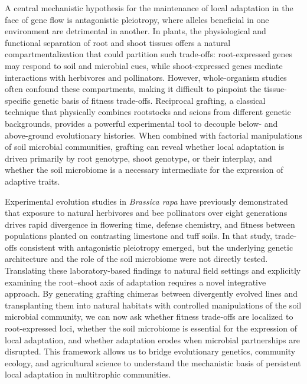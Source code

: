 \documentclass{article}
\begin{document}
A central mechanistic hypothesis for the maintenance of local adaptation in the face of gene flow is antagonistic pleiotropy, where alleles beneficial in one environment are detrimental in another. In plants, the physiological and functional separation of root and shoot tissues offers a natural compartmentalization that could partition such trade-offs: root-expressed genes may respond to soil and microbial cues, while shoot-expressed genes mediate interactions with herbivores and pollinators. However, whole-organism studies often confound these compartments, making it difficult to pinpoint the tissue-specific genetic basis of fitness trade-offs. Reciprocal grafting, a classical technique that physically combines rootstocks and scions from different genetic backgrounds, provides a powerful experimental tool to decouple below- and above-ground evolutionary histories. When combined with factorial manipulations of soil microbial communities, grafting can reveal whether local adaptation is driven primarily by root genotype, shoot genotype, or their interplay, and whether the soil microbiome is a necessary intermediate for the expression of adaptive traits.

Experimental evolution studies in \textit{Brassica rapa} have previously demonstrated that exposure to natural herbivores and bee pollinators over eight generations drives rapid divergence in flowering time, defense chemistry, and fitness between populations planted on contrasting limestone and tuff soils. In that study, trade-offs consistent with antagonistic pleiotropy emerged, but the underlying genetic architecture and the role of the soil microbiome were not directly tested. Translating these laboratory-based findings to natural field settings and explicitly examining the root–shoot axis of adaptation requires a novel integrative approach. By generating grafting chimeras between divergently evolved lines and transplanting them into natural habitats with controlled manipulations of the soil microbial community, we can now ask whether fitness trade-offs are localized to root-expressed loci, whether the soil microbiome is essential for the expression of local adaptation, and whether adaptation erodes when microbial partnerships are disrupted. This framework allows us to bridge evolutionary genetics, community ecology, and agricultural science to understand the mechanistic basis of persistent local adaptation in multitrophic communities.
\end{document}
